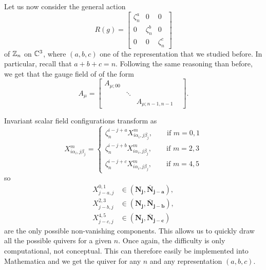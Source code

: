            Let us now consider the general action
           \begin{equation}
                R(g)=
                \begin{bmatrix}
                    \zeta^a_n & 0 & 0\\
                    0 & \zeta^b_n & 0\\
                    0 & 0 & \zeta^c_n
                \end{bmatrix}
           \end{equation}
           of $\mathbb{Z}_n$ on $\mathbb{C}^3$, where $(a,b,c)$ one of the representation that we studied before. In particular, recall that $a+b+c=n$. Following the same reasoning than before, we get that the gauge field of of the form
           \begin{equation}
               A_\mu=
               \begin{bmatrix}
                   A_{\mu;00} & & \\
                   & \ddots & & \\
                   & & A_{\mu;n-1,n-1}
               \end{bmatrix}.
           \end{equation}

           Invariant scalar field configurations transform as
           \begin{equation}
               X^m_{i\alpha_i,j\beta_j}=
               \begin{cases}
                   \zeta^{i-j+a}_nX^m_{i\alpha_i,j\beta_j},\qquad \text{if }m=0,1\\
                   \zeta^{i-j+b}_nX^m_{i\alpha_i,j\beta_j},\qquad \text{if }m=2,3\\
                   \zeta^{i-j+c}_nX^m_{i\alpha_i,j\beta_j},\qquad \text{if }m=4,5
               \end{cases}
           \end{equation}
           so
           \begin{align}
               X^{0,1}_{j-a,j} &\in (\boldsymbol{\textbf{N}_j},\boldsymbol{\bar{\textbf{N}}_{j-a}}),\\
               X^{2,3}_{j-b,j} &\in (\boldsymbol{\textbf{N}_j},\boldsymbol{\bar{\textbf{N}}_{j-b}}),\\
               X^{4,5}_{j-c,j} &\in (\boldsymbol{\textbf{N}_j},\boldsymbol{\bar{\textbf{N}}_{j-c}})
           \end{align}
           are the only possible non-vanishing components. This allows us to quickly draw all the possible quivers for a given $n$. Once again, the difficulty is only computational, not conceptual. This can therefore easily be implemented into Mathematica and we get the quiver for any $n$ and any representation $(a,b,c)$.
        
